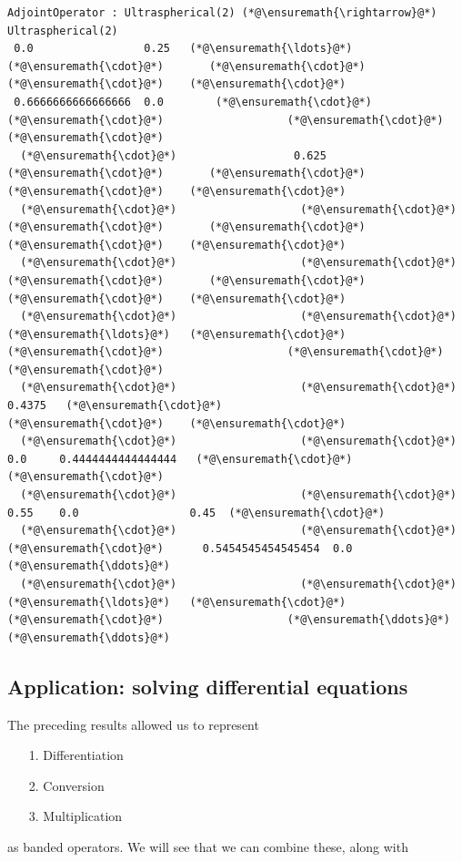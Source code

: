 \documentclass[12pt,a4paper]{article}
\begin{document}
\begin{lstlisting}
AdjointOperator : Ultraspherical(2) (*@\ensuremath{\rightarrow}@*) Ultraspherical(2)
 0.0                 0.25   (*@\ensuremath{\ldots}@*)   (*@\ensuremath{\cdot}@*)       (*@\ensuremath{\cdot}@*)                   (*@\ensuremath{\cdot}@*)    (*@\ensuremath{\cdot}@*)
 0.6666666666666666  0.0        (*@\ensuremath{\cdot}@*)       (*@\ensuremath{\cdot}@*)                   (*@\ensuremath{\cdot}@*)    (*@\ensuremath{\cdot}@*)
  (*@\ensuremath{\cdot}@*)                  0.625      (*@\ensuremath{\cdot}@*)       (*@\ensuremath{\cdot}@*)                   (*@\ensuremath{\cdot}@*)    (*@\ensuremath{\cdot}@*)
  (*@\ensuremath{\cdot}@*)                   (*@\ensuremath{\cdot}@*)         (*@\ensuremath{\cdot}@*)       (*@\ensuremath{\cdot}@*)                   (*@\ensuremath{\cdot}@*)    (*@\ensuremath{\cdot}@*)
  (*@\ensuremath{\cdot}@*)                   (*@\ensuremath{\cdot}@*)         (*@\ensuremath{\cdot}@*)       (*@\ensuremath{\cdot}@*)                   (*@\ensuremath{\cdot}@*)    (*@\ensuremath{\cdot}@*)
  (*@\ensuremath{\cdot}@*)                   (*@\ensuremath{\cdot}@*)     (*@\ensuremath{\ldots}@*)   (*@\ensuremath{\cdot}@*)       (*@\ensuremath{\cdot}@*)                   (*@\ensuremath{\cdot}@*)    (*@\ensuremath{\cdot}@*)
  (*@\ensuremath{\cdot}@*)                   (*@\ensuremath{\cdot}@*)        0.4375   (*@\ensuremath{\cdot}@*)                   (*@\ensuremath{\cdot}@*)    (*@\ensuremath{\cdot}@*)
  (*@\ensuremath{\cdot}@*)                   (*@\ensuremath{\cdot}@*)        0.0     0.4444444444444444   (*@\ensuremath{\cdot}@*)    (*@\ensuremath{\cdot}@*)
  (*@\ensuremath{\cdot}@*)                   (*@\ensuremath{\cdot}@*)        0.55    0.0                 0.45  (*@\ensuremath{\cdot}@*)
  (*@\ensuremath{\cdot}@*)                   (*@\ensuremath{\cdot}@*)         (*@\ensuremath{\cdot}@*)      0.5454545454545454  0.0   (*@\ensuremath{\ddots}@*)
  (*@\ensuremath{\cdot}@*)                   (*@\ensuremath{\cdot}@*)     (*@\ensuremath{\ldots}@*)   (*@\ensuremath{\cdot}@*)       (*@\ensuremath{\cdot}@*)                   (*@\ensuremath{\ddots}@*)    (*@\ensuremath{\ddots}@*)
\end{lstlisting}


\subsection{Application: solving differential equations}
The preceding results allowed us to represent

\begin{itemize}
\item[1. ] Differentiation


\item[2. ] Conversion


\item[3. ] Multiplication

\end{itemize}
as banded operators. We will see that we can combine these, along with
\end{document}
